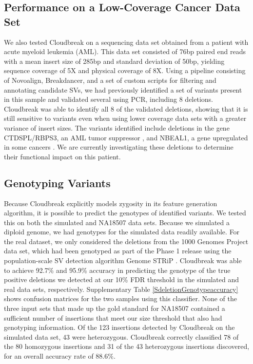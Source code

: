 \documentclass[11pt]{article}
\begin{document}
\subsection{Performance on a Low-Coverage Cancer Data Set}

We also tested Cloudbreak on a sequencing data set obtained from a patient with acute myeloid leukemia (AML). This data set consisted of 76bp paired end reads with a mean insert size of 285bp and standard deviation of 50bp, yielding sequence coverage of 5X and physical coverage of 8X. Using a pipeline consisting of Novoalign, Breakdancer, and a set of custom scripts for filtering and annotating candidate SVs, we had previously identified a set of variants present in this sample and validated several using PCR, including 8 deletions. Cloudbreak was able to identify all 8 of the validated deletions, showing that it is still sensitive to variants even when using lower coverage data sets with a greater variance of insert sizes. The variants identified include deletions in the gene CTDSPL/RBPS3, an AML tumor suppressor \autocite{Zheng:2012kk}, and NBEAL1, a gene upregulated in some cancers \autocite{Chen:2004jo}. We are currently investigating these deletions to determine their functional impact on this patient. 

\subsection{Genotyping Variants}

Because Cloudbreak explicitly models zygosity in its feature generation algorithm, it is possible to predict the genotypes of identified variants. We tested this on both the simulated and NA18507 data sets. Because we simulated a diploid genome, we had genotypes for the simulated data readily available. For the real dataset, we only considered the deletions from the 1000 Genomes Project data set, which had been genotyped as part of the Phase 1 release using the population-scale SV detection algorithm Genome STRiP \autocite{Handsaker:2011ki}. Cloudbreak was able to achieve 92.7\% and 95.9\% accuracy in predicting the genotype of the true positive deletions we detected at our 10\% FDR threshold in the simulated and real data sets, respectively. Supplementary Table \ref{SdeletionGenotypeaccuracy} shows confusion matrices for the two samples using this classifier. None of the three input sets that made up the gold standard for NA18507 contained a sufficient number of insertions that meet our size threshold that also had genotyping information. Of the 123 insertions detected by Cloudbreak on the simulated data set, 43 were heterozygous. Cloudbreak correctly classified 78 of the 80 homozygous insertions and 31 of the 43 heterozygous insertions discovered, for an overall accuracy rate of 88.6\%.
\end{document}
